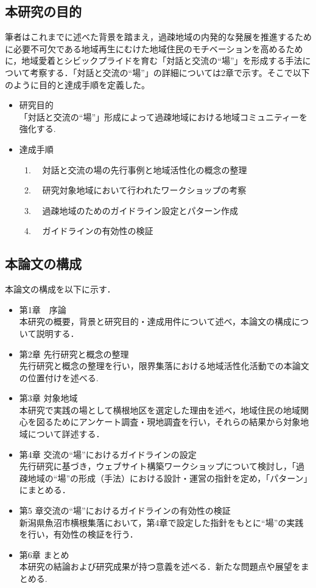 \documentclass[a4paper]{jsarticle}
\begin{document}
\subsection{本研究の目的}
筆者はこれまでに述べた背景を踏まえ，過疎地域の内発的な発展を推進するために必要不可欠である地域再生にむけた地域住民のモチベーションを高めるために，地域愛着とシビックプライドを育む「対話と交流の“場”」を形成する手法について考察する．「対話と交流の“場”」の詳細については2章で示す。そこで以下のように目的と達成手順を定義した。
\begin{itemize}
\item 研究目的　\\「対話と交流の“場”」形成によって過疎地域における地域コミュニティーを強化する.

\item 達成手順\\
\begin{enumerate}
\item　対話と交流の場の先行事例と地域活性化の概念の整理
\item　研究対象地域において行われたワークショップの考察
\item　過疎地域のためのガイドライン設定とパターン作成
\item　ガイドラインの有効性の検証
\end{enumerate}

\end{itemize}

\subsection{本論文の構成}
本論文の構成を以下に示す．
\begin{itemize}
\item 第1章　序論  \\本研究の概要，背景と研究目的・達成用件について述べ，本論文の構成について説明する．
\item 第2章 先行研究と概念の整理  \\先行研究と概念の整理を行い，限界集落における地域活性化活動での本論文の位置付けを述べる.

\item 第3章 対象地域  \\本研究で実践の場として横根地区を選定した理由を述べ，地域住民の地域関心を図るためにアンケート調査・現地調査を行い，それらの結果から対象地域について詳述する．
\item 第4章 交流の“場”におけるガイドラインの設定 \\先行研究に基づき，ウェブサイト構築ワークショップについて検討し，「過疎地域の“場”の形成（手法）における設計・運営の指針を定め，「パターン」にまとめる．

\item 第5 章交流の“場”におけるガイドラインの有効性の検証 \\新潟県魚沼市横根集落において，第4章で設定した指針をもとに“場”の実践を行い，有効性の検証を行う．
\item 第6章 まとめ \\本研究の結論および研究成果が持つ意義を述べる．新たな問題点や展望をまとめる.


\end{itemize}
\newpage
\end{document}
